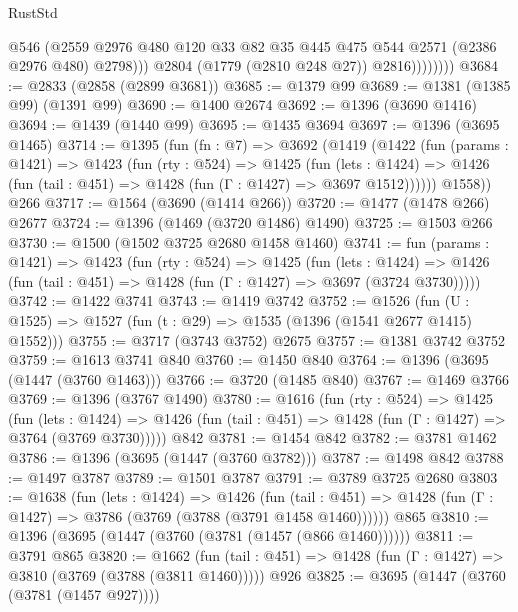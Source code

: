 \begin{lexlean}{RustStd}
\begin{coremodule}
                        @546
                        (@2559
                          @2976
                          @480
                          @120
                          @33
                          @82
                          @35
                          @445
                          @475
                          @544
                          @2571
                          (@2386 @2976 @480)
                          @2798)))
                    @2804
                    (@1779 (@2810 @248 @27))
                    @2816))))))))
@3684 := @2833 (@2858 (@2899 @3681))
@3685 := @1379 @99
@3689 := @1381 (@1385 @99) (@1391 @99)
@3690 := @1400 @2674
@3692 := @1396 (@3690 @1416)
@3694 := @1439 (@1440 @99)
@3695 := @1435 @3694
@3697 := @1396 (@3695 @1465)
@3714 := @1395
    (fun (fn : @7) =>
    @3692
      (@1419
        (@1422
          (fun (params : @1421) =>
          @1423
            (fun (rty : @524) =>
            @1425
              (fun (lets : @1424) =>
              @1426 (fun (tail : @451) => @1428 (fun (Γ : @1427) => @3697 @1512))))))
        @1558))
    @266
@3717 := @1564 (@3690 (@1414 @266))
@3720 := @1477 (@1478 @266) @2677
@3724 := @1396 (@1469 (@3720 @1486) @1490)
@3725 := @1503 @266
@3730 := @1500 (@1502 @3725 @2680 @1458 @1460)
@3741 := fun (params : @1421) =>
  @1423
    (fun (rty : @524) =>
    @1425
      (fun (lets : @1424) =>
      @1426 (fun (tail : @451) => @1428 (fun (Γ : @1427) => @3697 (@3724 @3730)))))
@3742 := @1422 @3741
@3743 := @1419 @3742
@3752 := @1526 (fun (U : @1525) => @1527 (fun (t : @29) => @1535 (@1396 (@1541 @2677 @1415) @1552)))
@3755 := @3717 (@3743 @3752) @2675
@3757 := @1381 @3742 @3752
@3759 := @1613 @3741 @840
@3760 := @1450 @840
@3764 := @1396 (@3695 (@1447 (@3760 @1463)))
@3766 := @3720 (@1485 @840)
@3767 := @1469 @3766
@3769 := @1396 (@3767 @1490)
@3780 := @1616
    (fun (rty : @524) =>
    @1425
      (fun (lets : @1424) =>
      @1426 (fun (tail : @451) => @1428 (fun (Γ : @1427) => @3764 (@3769 @3730)))))
    @842
@3781 := @1454 @842
@3782 := @3781 @1462
@3786 := @1396 (@3695 (@1447 (@3760 @3782)))
@3787 := @1498 @842
@3788 := @1497 @3787
@3789 := @1501 @3787
@3791 := @3789 @3725 @2680
@3803 := @1638
    (fun (lets : @1424) =>
    @1426
      (fun (tail : @451) => @1428 (fun (Γ : @1427) => @3786 (@3769 (@3788 (@3791 @1458 @1460))))))
    @865
@3810 := @1396 (@3695 (@1447 (@3760 (@3781 (@1457 (@866 @1460))))))
@3811 := @3791 @865
@3820 := @1662
    (fun (tail : @451) => @1428 (fun (Γ : @1427) => @3810 (@3769 (@3788 (@3811 @1460)))))
    @926
@3825 := @3695 (@1447 (@3760 (@3781 (@1457 @927))))

\end{coremodule}
\end{lexlean}
